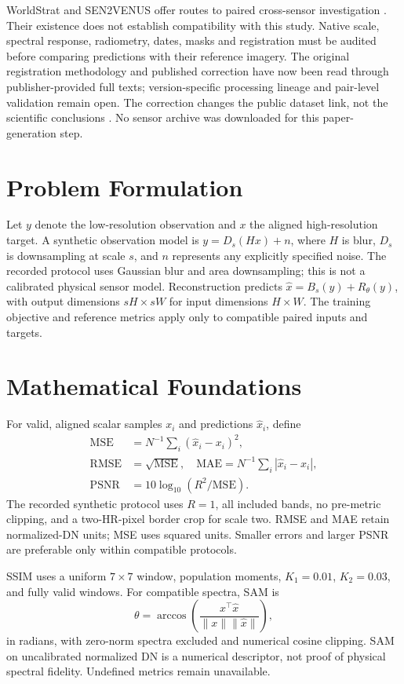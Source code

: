\documentclass[conference]{IEEEtran}
\begin{document}
WorldStrat and SEN2VENUS offer routes to paired cross-sensor investigation \cite{cornebise2022worldstrat,michel2022sen2venus}. Their existence does not establish compatibility with this study. Native scale, spectral response, radiometry, dates, masks and registration must be audited before comparing predictions with their reference imagery. The original registration methodology and published correction have now been read through publisher-provided full texts; version-specific processing lineage and pair-level validation remain open. The correction changes the public dataset link, not the scientific conclusions \cite{michel2023correction}. No sensor archive was downloaded for this paper-generation step.


\section{Problem Formulation}
Let $y$ denote the low-resolution observation and $x$ the aligned high-resolution target. A synthetic observation model is $y=D_s(Hx)+n$, where $H$ is blur, $D_s$ is downsampling at scale $s$, and $n$ represents any explicitly specified noise. The recorded protocol uses Gaussian blur and area downsampling; this is not a calibrated physical sensor model. Reconstruction predicts $\hat{x}=B_s(y)+R_\theta(y)$, with output dimensions $sH\times sW$ for input dimensions $H\times W$. The training objective and reference metrics apply only to compatible paired inputs and targets.
\section{Mathematical Foundations}
For valid, aligned scalar samples $x_i$ and predictions $\hat{x}_i$, define
\begin{align}
\mathrm{MSE}&=N^{-1}\sum_i(\hat{x}_i-x_i)^2,\\
\mathrm{RMSE}&=\sqrt{\mathrm{MSE}},\quad
\mathrm{MAE}=N^{-1}\sum_i|\hat{x}_i-x_i|,\\
\mathrm{PSNR}&=10\log_{10}(R^2/\mathrm{MSE}).
\end{align}
The recorded synthetic protocol uses $R=1$, all included bands, no pre-metric clipping, and a two-HR-pixel border crop for scale two. RMSE and MAE retain normalized-DN units; MSE uses squared units. Smaller errors and larger PSNR are preferable only within compatible protocols.

SSIM uses a uniform $7\times7$ window, population moments, $K_1=0.01$, $K_2=0.03$, and fully valid windows. For compatible spectra, SAM is
\begin{equation}
\theta=\arccos\!\left(\frac{x^\top\hat{x}}{\|x\|\|\hat{x}\|}\right),
\end{equation}
in radians, with zero-norm spectra excluded and numerical cosine clipping. SAM on uncalibrated normalized DN is a numerical descriptor, not proof of physical spectral fidelity. Undefined metrics remain unavailable.
\end{document}
